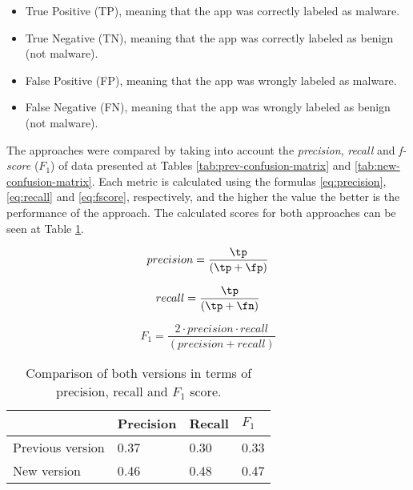 \begin{itemize}
    \item True Positive (TP), meaning that the app was correctly labeled as malware.
    \item True Negative (TN), meaning that the app was correctly labeled as benign (not malware).
    \item False Positive (FP), meaning that the app was wrongly labeled as malware.
    \item False Negative (FN), meaning that the app was wrongly labeled as benign (not malware).
\end{itemize}

The approaches were compared by taking into account the \textit{precision}, \textit{recall} and \textit{f-score} ($F_1$) of data presented at Tables \ref{tab:prev-confusion-matrix} and \ref{tab:new-confusion-matrix}. Each metric is calculated using the formulas \ref{eq:precision}, \ref{eq:recall} and \ref{eq:fscore}, respectively, and the higher the value the better is the performance of the approach. The calculated scores for both approaches can be seen at Table \ref{tab:metrics-results}.

\begin{equation}
\label{eq:precision}
    precision = \frac{\tp}{(\tp + \fp)}
\end{equation}

\begin{equation}
\label{eq:recall}
    recall = \frac{\tp}{(\tp + \fn)}
\end{equation}

\begin{equation}
\label{eq:fscore}
    F_1 = \frac{2 \cdot precision \cdot recall}{(precision + recall)}
\end{equation}

\begin{table}[h]
\centering
\caption{Comparison of both versions in terms of precision, recall and $F_1$ score. }
\label{tab:metrics-results}
\begin{tabular}{l|l|l|l|}
\cline{2-4}
                                       & \textbf{Precision} & \textbf{Recall} & \textbf{$F_1$} \\ \hline
\multicolumn{1}{|l|}{Previous version} & 0.37               & 0.30            & 0.33          \\ \hline
\multicolumn{1}{|l|}{New version}      & 0.46               & 0.48            & 0.47          \\ \hline
\end{tabular}
\end{table}

